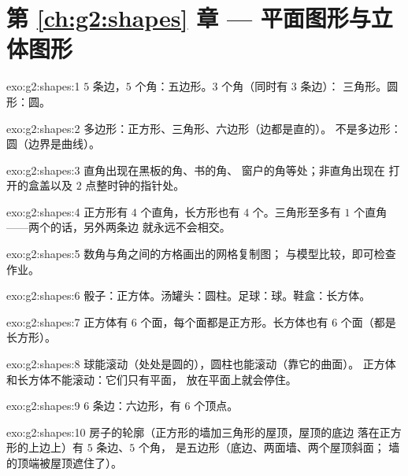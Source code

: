 \section*{第 \ref{ch:g2:shapes} 章 --- 平面图形与立体图形}

\begin{solution}{exo:g2:shapes:1}
$5$ 条边，$5$ 个角：五边形。$3$ 个角（同时有 $3$ 条边）：
三角形。圆形：圆。
\end{solution}

\begin{solution}{exo:g2:shapes:2}
多边形：正方形、三角形、六边形（边都是直的）。
不是多边形：圆（边界是曲线）。
\end{solution}

\begin{solution}{exo:g2:shapes:3}
直角出现在黑板的角、书的角、
窗户的角等处；非直角出现在
打开的盒盖以及 $2$ 点整时钟的指针处。
\end{solution}

\begin{solution}{exo:g2:shapes:4}
正方形有 $4$ 个直角，长方形也有 $4$ 个。三角形至多有
$1$ 个直角——两个的话，另外两条边
就永远不会相交。
\end{solution}

\begin{solution}{exo:g2:shapes:5}
数角与角之间的方格画出的网格复制图；
与模型比较，即可检查作业。
\end{solution}

\begin{solution}{exo:g2:shapes:6}
骰子：正方体。汤罐头：圆柱。足球：球。鞋盒：长方体。
\end{solution}

\begin{solution}{exo:g2:shapes:7}
正方体有 $6$ 个面，每个面都是正方形。长方体也有
$6$ 个面（都是长方形）。
\end{solution}

\begin{solution}{exo:g2:shapes:8}
球能滚动（处处是圆的），圆柱也能滚动（靠它的曲面）。
正方体和长方体不能滚动：它们只有平面，
放在平面上就会停住。
\end{solution}

\begin{solution}{exo:g2:shapes:9}
$6$ 条边：六边形，有 $6$ 个顶点。
\end{solution}

\begin{solution}{exo:g2:shapes:10}
房子的轮廓（正方形的墙加三角形的屋顶，屋顶的底边
落在正方形的上边上）有 $5$ 条边、$5$ 个角，
是五边形（底边、两面墙、两个屋顶斜面；
墙的顶端被屋顶遮住了）。
\end{solution}
